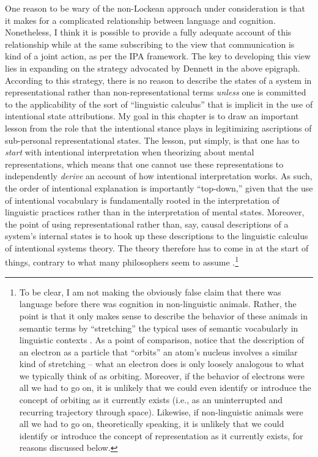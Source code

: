 One reason to be wary of the non-Lockean approach under consideration is that it makes for a complicated relationship between language and cognition. Nonetheless, I think it is possible to provide a fully adequate account of this relationship while at the same subscribing to the view that communication is kind of a joint action, as per the IPA framework. The key to developing this view lies in expanding on the strategy advocated by Dennett in the above epigraph. According to this strategy, there is no reason to describe the states of a system in representational rather than non-representational terms \textit{unless} one is committed to the applicability of the sort of ``linguistic calculus'' that is implicit in the use of intentional state attributions. My goal in this chapter is to draw an important lesson from the role that the intentional stance plays in legitimizing ascriptions of sub-personal representational states. The lesson, put simply, is that one has to \textit{start} with intentional interpretation when theorizing about mental representations, which means that one cannot use these representations to independently \textit{derive} an account of how intentional interpretation works. As such, the order of intentional explanation is importantly ``top-down,'' given that the use of intentional vocabulary is fundamentally rooted in the interpretation of linguistic practices rather than in the interpretation of mental states. Moreover, the point of using representational rather than, say, causal descriptions of a system's internal states is to hook up these descriptions to the linguistic calculus of intentional systems theory. The theory therefore has to come in at the start of things, contrary to what many philosophers seem to assume \citep[e.g.,][]{Millikan:1989,Fodor:1998,Dretske:1986}.\footnote{To be clear, I am not making the obviously false claim that there was language before there was cognition in non-linguistic animals. Rather, the point is that it only makes sense to describe the behavior of these animals in semantic terms by ``stretching'' the typical uses of semantic vocabularly in linguistic contexts \citep[][p. 59]{Dennett:2010,Brandom:2010}. As a point of comparison, notice that the description of an electron as a particle that ``orbits'' an atom's nucleus involves a similar kind of stretching -- what an electron does is only loosely analogous to what we typically think of as orbiting. Moreover, if the behavior of electrons were all we had to go on, it is unlikely that we could even identify or introduce the concept of orbiting as it currently exists (i.e., as an uninterrupted and recurring trajectory through space). Likewise, if non-linguistic animals were all we had to go on, theoretically speaking, it is unlikely that we could identify or introduce the concept of representation as it currently exists, for reasons discussed below.} 

